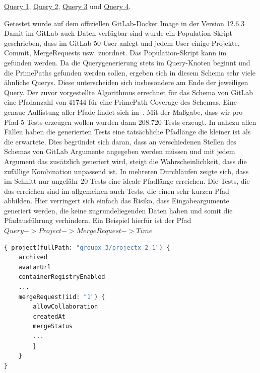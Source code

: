 \hyperref[query1]{Query 1},
\hyperref[query2]{Query 2},
\hyperref[query3]{Query 3} und
\hyperref[query4]{Query 4}.

Getestet wurde auf dem offiziellen GitLab-Docker Image in der Version 12.6.3
Damit im GitLab auch Daten verfügbar sind wurde ein Population-Skript geschrieben, dass im GitLab
50 User anlegt und jedem User einige Projekte, Commit, MergeRequests usw. zuordnet.
Das Population-Skript kann im~\cite[Github]{populationscript} gefunden werden.
Da die Querygenerierung stets im Query-Knoten beginnt und die PrimePaths gefunden werden sollen, ergeben sich in diesem Schema sehr viele ähnliche Querys.
Diese unterscheiden sich insbesondere am Ende der jeweiligen Query.
Der zuvor vorgestellte Algorithmus errechnet für das Schema von GitLab eine Pfadanzahl von 41744 für eine PrimePath-Coverage des Schemas.
Eine genaue Auflistung aller Pfade findet sich im~\cite[GitHub]{gitlabpaths}.
Mit der Maßgabe, dass wir pro Pfad 5 Tests erzeugen wollen wurden dann 208.720 Tests erzeugt.
In nahezu allen Fällen haben die generierten Tests eine tatsächliche Pfadlänge die kleiner ist als die erwartete.
Dies begründet sich daran, dass an verschiedenen Stellen des Schemas von GitLab Argumente angegeben werden müssen
und mit jedem Argument das zusätzlich generiert wird, steigt die Wahrscheinlichkeit, dass die zufällige Kombination unpassend ist.
In mehreren Durchläufen zeigte sich, dass im Schnitt nur ungefähr 20 Tests eine ideale Pfadlänge erreichen.
Die Tests, die das erreichen sind im allgemeinen auch Tests, die einen sehr kurzen Pfad abbilden.
Hier verringert sich einfach das Risiko, dass Eingabeargumente generiert werden, die keine zugrundeliegenden Daten haben und somit die Pfadausführung verhindern.
Ein Beispiel hierfür ist der Pfad $Query -> Project -> MergeRequest -> Time$

\begin{lstlisting}[language=GraphQL]
{ project(fullPath: "groupx_3/projectx_2_1") {
    archived
    avatarUrl
    containerRegistryEnabled
    ...
    mergeRequest(iid: "1") {
        allowCollaboration
        createdAt
        mergeStatus
        ...
        }
    }
}
\end{lstlisting}

